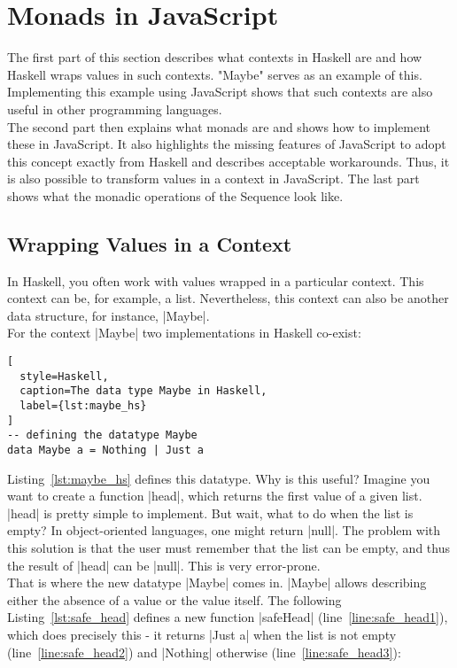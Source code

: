 \section{Monads in JavaScript} %
\label{sec:Monads in JavaScript}
The first part of this section describes what contexts in Haskell are and how
Haskell wraps values in such contexts. "Maybe" serves as an example of this.
Implementing this example using JavaScript shows that such contexts are also
useful in other programming languages.\\
The second part then explains what monads are and shows how to implement these
in JavaScript. It also highlights the missing features of JavaScript to adopt
this concept exactly from Haskell and describes acceptable workarounds. Thus, it
is also possible to transform values in a context in JavaScript. The
last part shows what the monadic operations of the Sequence look like.

\subsection{Wrapping Values in a Context} %
\label{sub:Wrapping values in a context}

In Haskell, you often work with values wrapped in a particular context. This
context can be, for example, a list. Nevertheless, this context can also be
another data structure, for instance, |Maybe|. \\
For the context |Maybe| two implementations in Haskell co-exist:

\begin{lstlisting}[
  style=Haskell,
  caption=The data type Maybe in Haskell,
  label={lst:maybe_hs}
]
-- defining the datatype Maybe
data Maybe a = Nothing | Just a
\end{lstlisting}

Listing~\ref{lst:maybe_hs} defines this datatype. Why is this useful?
Imagine you want to create a function |head|, which returns the first value of
a given list. |head| is pretty simple to implement. But wait, what to do when
the list is empty? In object-oriented languages, one might return |null|. The
problem with this solution is that the user must remember that the list can be
empty, and thus the result of |head| can be |null|. This is very error-prone.
\\

That is where the new datatype |Maybe| comes in. |Maybe| allows describing
either the absence of a value or the value itself. The following
Listing~\ref{lst:safe_head} defines a new function |safeHead|
(line~\ref{line:safe_head1}), which does
precisely this - it returns |Just a| when the list is not empty
(line~\ref{line:safe_head2}) and |Nothing| otherwise (line~\ref{line:safe_head3}):

